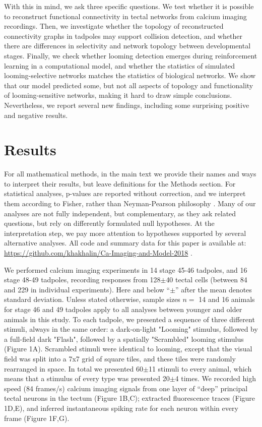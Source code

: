 \documentclass{article}
\begin{document}
With this in mind, we ask three specific questions. We test whether it is possible to reconstruct functional connectivity in tectal networks from calcium imaging recordings. Then, we investigate whether the topology of reconstructed connectivity graphs in tadpoles may support collision detection, and whether there are differences in selectivity and network topology between developmental stages. Finally, we check whether looming detection emerges during reinforcement learning in a computational model, and whether the statistics of simulated looming-selective networks matches the statistics of biological networks. We show that our model predicted some, but not all aspects of topology and functionality of looming-sensitive networks, making it hard to draw simple conclusions. Nevertheless, we report several new findings, including some surprising positive and negative results.

\section*{Results}

For all mathematical methods, in the main text we provide their names and ways to interpret their results, but leave definitions for the Methods section. For statistical analyses, p-values are reported without correction, and we interpret them according to Fisher, rather than Neyman-Pearson philosophy \citep{greenland2016}. Many of our analyses are not fully independent, but complementary, as they ask related questions, but rely on differently formulated null hypotheses. At the interpretation step, we pay more attention to hypotheses supported by several alternative analyses. All code and summary data for this paper is available at:  \url{https://github.com/khakhalin/Ca-Imaging-and-Model-2018} .


We performed calcium imaging experiments in 14 stage 45-46 tadpoles, and 16 stage 48-49 tadpoles, recording responses from 128$\pm$40 tectal cells (between 84 and 229 in individual experiments). Here and below “$\pm$” after the mean denotes standard deviation. Unless stated otherwise, sample sizes $n=$ 14 and 16 animals for stage 46 and 49 tadpoles apply to all analyses between younger and older animals in this study. To each tadpole, we presented a sequence of three different stimuli, always in the same order: a dark-on-light "Looming" stimulus, followed by a full-field dark "Flash", followed by a spatially "Scrambled" looming stimulus (Figure 1A). Scrambled stimuli were identical to looming, except that the visual field was split into a 7x7 grid of square tiles, and these tiles were randomly rearranged in space. In total we presented 60$\pm$11 stimuli to every animal, which means that a stimulus of every type was presented 20$\pm$4 times. We recorded high speed (84 frames/s) calcium imaging signals \citep{xu2011, truszkowski2017} from one layer of “deep” principal tectal neurons in the tectum (Figure 1B,C); extracted fluorescence traces (Figure 1D,E), and inferred instantaneous spiking rate for each neuron within every frame (Figure 1F,G).
\end{document}
